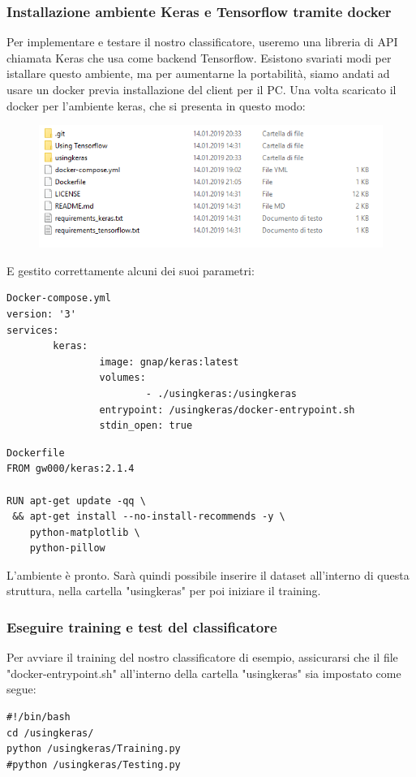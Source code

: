 \documentclass[twoside]{supsistudent}
\newcommand{\Decaa}{\newline\vspace{0.5mm}\newline\noindent}
\begin{document}
\subsubsection{Installazione ambiente Keras e Tensorflow tramite docker}
Per implementare e testare il nostro classificatore, useremo una libreria di API chiamata Keras\cite{keras} che usa come backend Tensorflow. Esistono svariati modi per istallare questo ambiente, ma per aumentarne la portabilità, siamo andati ad usare un docker\cite{docker} previa installazione del client per il PC.
\Decaa
Una volta scaricato il docker per l'ambiente keras\cite{docker}, che si presenta in questo modo:
\begin{figure}[h!]
  \centering
    \includegraphics[width=1\textwidth]{Pictures/strutturaDirectory.PNG}
\end{figure}
\newline
E gestito correttamente alcuni dei suoi parametri: 
\begin{lstlisting}
Docker-compose.yml
version: '3'
services:
        keras:
                image: gnap/keras:latest
                volumes:
                        - ./usingkeras:/usingkeras
                entrypoint: /usingkeras/docker-entrypoint.sh
                stdin_open: true

\end{lstlisting}

\begin{lstlisting}
Dockerfile
FROM gw000/keras:2.1.4

RUN apt-get update -qq \
 && apt-get install --no-install-recommends -y \
    python-matplotlib \
    python-pillow
\end{lstlisting}

L'ambiente è pronto. Sarà quindi possibile inserire il dataset all'interno di questa struttura, nella cartella "usingkeras" per poi iniziare il training.

\subsubsection{Eseguire training e test del classificatore}
Per avviare il training del nostro classificatore di esempio, assicurarsi che il file "docker-entrypoint.sh" all'interno della cartella "usingkeras" sia impostato come segue:
\begin{lstlisting}
#!/bin/bash
cd /usingkeras/
python /usingkeras/Training.py 
#python /usingkeras/Testing.py
\end{lstlisting}
\end{document}
